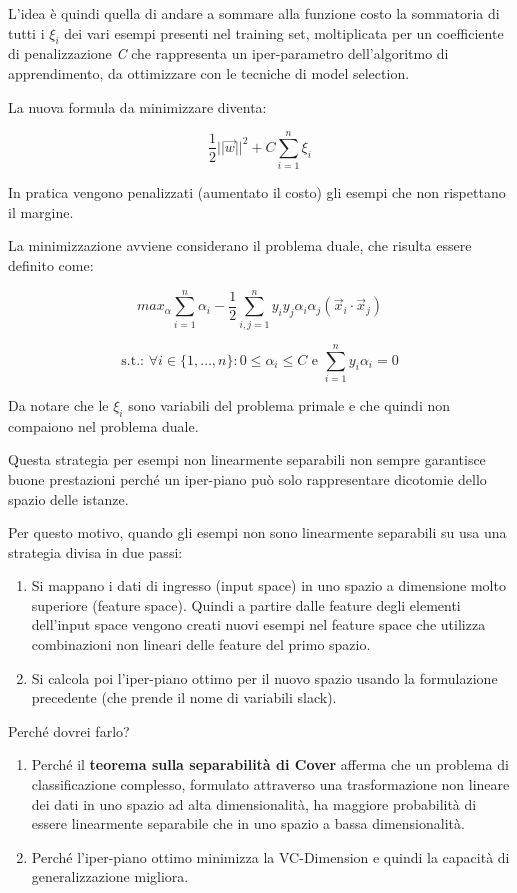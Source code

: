 L'idea è quindi quella di andare a sommare alla funzione costo la sommatoria di tutti i $\xi_i$ dei vari esempi presenti nel training set, moltiplicata per un coefficiente di penalizzazione \textit{C} che rappresenta un iper-parametro dell'algoritmo di apprendimento, da ottimizzare con le tecniche di model selection.

La nuova formula da minimizzare diventa:

$$ \frac{1}{2}||\vec{w}||^2 + C \sum\limits_{i=1}^n \xi_i $$

In pratica vengono penalizzati (aumentato il costo) gli esempi che non rispettano il margine.

La minimizzazione avviene considerano il problema duale, che risulta essere definito come:

$$max_\alpha \sum\limits_{i=1}^n \alpha_i - \frac{1}{2}\sum\limits_{i,j = 1}^n y_i y_j \alpha_i \alpha_j (\vec{x}_i \cdot \vec{x}_j)$$

$$ \text{s.t.: } \forall i \in \{1, \ldots, n\} : 0 \leq \alpha_i \leq C \text{ e } \sum\limits_{i=1}^n y_i \alpha_i = 0$$

Da notare che le $\xi_i$ sono variabili del problema primale e che quindi non compaiono nel problema duale.

Questa strategia per esempi non linearmente separabili non sempre
garantisce buone prestazioni perché un iper-piano può solo rappresentare
dicotomie dello spazio delle istanze.

Per questo motivo, quando gli esempi non sono linearmente separabili su
usa una strategia divisa in due passi:

\begin{enumerate}
\item
  Si mappano i dati di ingresso (input space) in uno spazio a dimensione
  molto superiore (feature space). Quindi a partire dalle feature degli
  elementi dell'input space vengono creati nuovi esempi nel feature
  space che utilizza combinazioni non lineari delle feature del primo
  spazio.
\item
  Si calcola poi l'iper-piano ottimo per il nuovo spazio usando la
  formulazione precedente (che prende il nome di variabili slack).
\end{enumerate}

Perché dovrei farlo?

\begin{enumerate}
\item
  Perché il \textbf{teorema sulla separabilità di Cover} afferma che un problema di classificazione complesso, formulato
  attraverso una trasformazione non lineare dei dati in uno spazio ad
  alta dimensionalità, ha maggiore probabilità di essere linearmente
  separabile che in uno spazio a bassa dimensionalità.
\item
  Perché l'iper-piano ottimo minimizza la VC-Dimension e quindi la
  capacità di generalizzazione migliora.
\end{enumerate}

